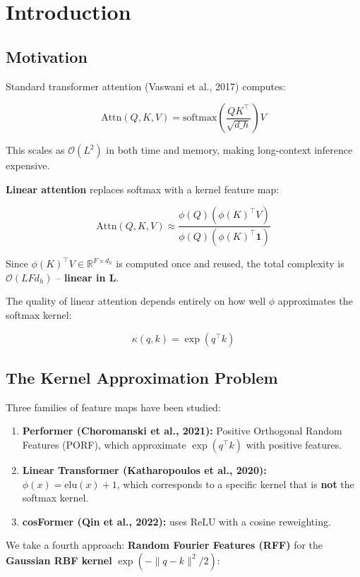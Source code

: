 \section{Introduction}

\subsection{Motivation}

Standard transformer attention (Vaswani et al., 2017) computes:

\[
\text{Attn}(Q, K, V) = \text{softmax}\!\left(\frac{Q K^\top}{\sqrt{d\_h}}\right) V
\tag{1.1}
\]

This scales as $\mathcal{O}(L^2)$ in both time and memory, making 
long-context inference expensive.

\textbf{Linear attention} replaces softmax with a kernel feature map:

\[
\text{Attn}(Q, K, V) \approx \frac{\phi(Q) \left(\phi(K)^\top V\right)}{\phi(Q) \left(\phi(K)^\top \mathbf{1}\right)}
\tag{1.2}
\]

Since $\phi(K)^\top V \in \mathbb{R}^{F \times d_h}$ is computed once and 
reused, the total complexity is $\mathcal{O}(L F d_h)$ -- \textbf{linear in L}.

The quality of linear attention depends entirely on how well $\phi$ 
approximates the softmax kernel:

\[
\kappa(q, k) = \exp(q^\top k)
\tag{1.3}
\]

\subsection{The Kernel Approximation Problem}

Three families of feature maps have been studied:

\begin{enumerate}
\item \textbf{Performer (Choromanski et al., 2021):} Positive Orthogonal Random
  Features (PORF), which approximate $\exp(q^\top k)$ with positive
  features.
\item \textbf{Linear Transformer (Katharopoulos et al., 2020):} $\phi(x) = \text{elu}(x) + 1$,
  which corresponds to a specific kernel that is \textbf{not} the softmax
  kernel.
\item \textbf{cosFormer (Qin et al., 2022):} uses $\text{ReLU}$ with a cosine
  reweighting.

\end{enumerate}
We take a fourth approach: \textbf{Random Fourier Features (RFF)} for the 
\textbf{Gaussian RBF kernel} $\exp(-\|q - k\|^2 / 2)$:

